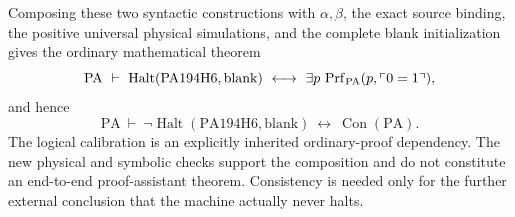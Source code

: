 Composing these two syntactic constructions with $\alpha,\beta$, the exact
source binding, the positive universal physical simulations, and the
complete blank initialization gives the ordinary mathematical theorem
\[
 \mathrm{PA}\ \vdash\
 \operatorname{Halt}(\mathrm{PA194H6},\mathrm{blank})
 \ \longleftrightarrow\
 \exists p\,\operatorname{Prf}_{\rm PA}(p,\ulcorner0=1\urcorner),
\]
and hence
\[
 \mathrm{PA}\ \vdash\
 \neg\operatorname{Halt}(\mathrm{PA194H6},\mathrm{blank})
 \ \longleftrightarrow\ \operatorname{Con}(\mathrm{PA}).
\]
The logical calibration is an explicitly inherited ordinary-proof dependency.
The new physical and symbolic checks support the composition and do not
constitute an end-to-end proof-assistant theorem.  Consistency is needed only
for the further external conclusion that the machine actually never halts.
